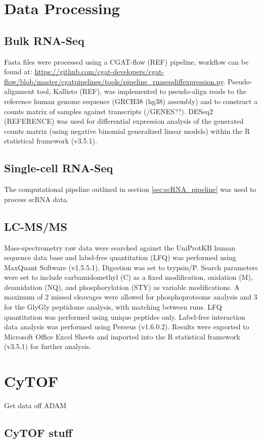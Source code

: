 \section{Data Processing}
\subsection{Bulk RNA-Seq}
Fasta files were processed using a CGAT-flow (REF) pipeline, workflow can be found at: \url{https://github.com/cgat-developers/cgat-flow/blob/master/cgatpipelines/tools/pipeline_rnaseqdiffexpression.py}. Pseudo-alignment tool, Kallisto (REF), was implemented to pseudo-align reads to the reference human genome sequence (GRCH38 (hg38) assembly) and to construct a counts matrix of samples against transcripts (/GENES??). DESeq2 (REFERENCE) was used for differential expression analysis of the generated  counts  matrix  (using  negative  binomial  generalized  linear  models) within the R statistical framework (v3.5.1).

\subsection{Single-cell RNA-Seq}
The computational pipeline outlined in section \ref{sec:scRNA_pipeline} was used to process scRNA data.

\subsection{LC-MS/MS}
Mass-spectrometry raw data were searched against the UniProtKB human sequence data base and label-free quantitation (LFQ) was performed using MaxQuant Software (v1.5.5.1). Digestion was set to trypsin/P. Search parameters were set to include carbamidomethyl (C) as a fixed modification, oxidation (M), deamidation (NQ), and phosphorylation (STY) as variable modifications. A maximum of 2 missed cleavages were allowed for phosphoproteome analysis and 3 for the GlyGly peptidome analysis, with matching between runs. LFQ quantitation was performed using unique peptides only. Label-free interaction data analysis was performed using Perseus (v1.6.0.2). Results were exported to Microsoft Office Excel Sheets and imported into the R statistical framework (v3.5.1) for further analysis.


\section{CyTOF}
Get data off ADAM
\subsection{CyTOF stuff}
